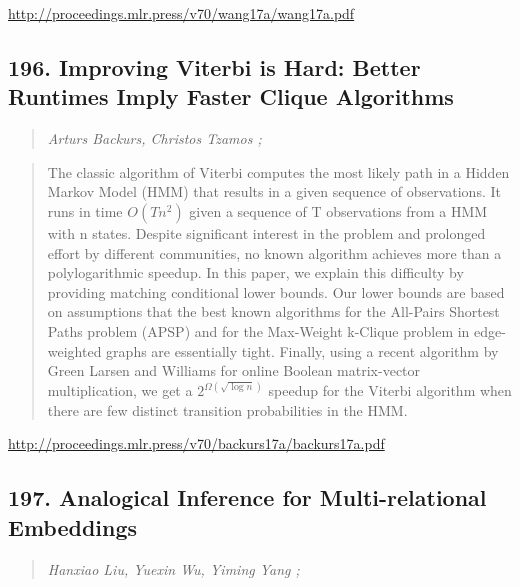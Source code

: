 \documentclass{article}
\begin{document}
\href{http://proceedings.mlr.press/v70/wang17a/wang17a.pdf}{http://proceedings.mlr.press/v70/wang17a/wang17a.pdf}

\subsection{196. Improving Viterbi is Hard: Better Runtimes Imply Faster Clique Algorithms}

\begin{quote}
\footnotesize{\textit{Arturs Backurs, Christos Tzamos ;}}

\end{quote}

\begin{quote}
    The classic algorithm of Viterbi computes the most likely path in a Hidden Markov Model (HMM) that results in a given sequence of observations. It runs in time $O(Tn^2)$ given a sequence of T observations from a HMM with n states. Despite significant interest in the problem and prolonged effort by different communities, no known algorithm achieves more than a polylogarithmic speedup. In this paper, we explain this difficulty by providing matching conditional lower bounds. Our lower bounds are based on assumptions that the best known algorithms for the All-Pairs Shortest Paths problem (APSP) and for the Max-Weight k-Clique problem in edge-weighted graphs are essentially tight. Finally, using a recent algorithm by Green Larsen and Williams for online Boolean matrix-vector multiplication, we get a $2^{\Omega(\sqrt{\log n})}$ speedup for the Viterbi algorithm when there are few distinct transition probabilities in the HMM.  
\end{quote}

\href{http://proceedings.mlr.press/v70/backurs17a/backurs17a.pdf}{http://proceedings.mlr.press/v70/backurs17a/backurs17a.pdf}

\subsection{197. Analogical Inference for Multi-relational Embeddings}

\begin{quote}
\footnotesize{\textit{Hanxiao Liu, Yuexin Wu, Yiming Yang ;}}

\end{quote}
\end{document}
